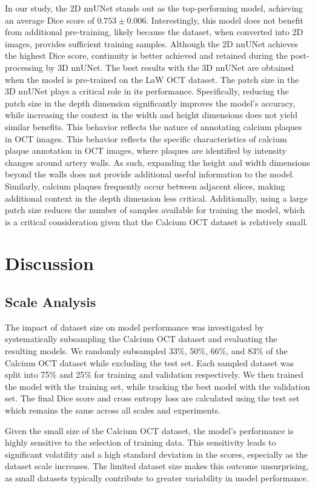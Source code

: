 \documentclass[a4paper,11pt,oneside]{report}
\begin{document}
In our study, the 2D nnUNet stands out as the top-performing model, achieving an average Dice score of $0.753 \pm 0.006$. Interestingly, this model does not benefit from additional pre-training, likely because the dataset, when converted into 2D images, provides sufficient training samples.
Although the 2D nnUNet achieves the highest Dice score, continuity is better achieved and retained during the post-processing by 3D nnUNet. 
The best results with the 3D nnUNet are obtained when the model is pre-trained on the LaW OCT dataset. The patch size in the 3D nnUNet plays a critical role in its performance. Specifically, reducing the patch size in the depth dimension significantly improves the model’s accuracy, while increasing the context in the width and height dimensions does not yield similar benefits. This behavior reflects the nature of annotating calcium plaques in OCT images. This behavior reflects the specific characteristics of calcium plaque annotation in OCT images, where plaques are identified by intensity changes around artery walls. As such, expanding the height and width dimensions beyond the walls does not provide additional useful information to the model. Similarly, calcium plaques frequently occur between adjacent slices, making additional context in the depth dimension less critical. Additionally, using a large patch size reduces the number of samples available for training the model, which is a critical consideration given that the Calcium OCT dataset is relatively small.

\section{Discussion}
\subsection{Scale Analysis}
The impact of dataset size on model performance was investigated by systematically subsampling the Calcium OCT dataset and evaluating the resulting models. We randomly subsampled 33\%, 50\%, 66\%, and 83\% of the Calcium OCT dataset while excluding the test set. Each sampled dataset was split into 75\% and 25\% for training and validation respectively. We then trained the model with the training set, while tracking the best model with the validation set. The final Dice score and cross entropy loss are calculated using the test set which remains the same across all scales and experiments.

Given the small size of the Calcium OCT dataset, the model's performance is highly sensitive to the selection of training data. This sensitivity leads to significant volatility and a high standard deviation in the scores, especially as the dataset scale increases. The limited dataset size makes this outcome unsurprising, as small datasets typically contribute to greater variability in model performance.
\end{document}
